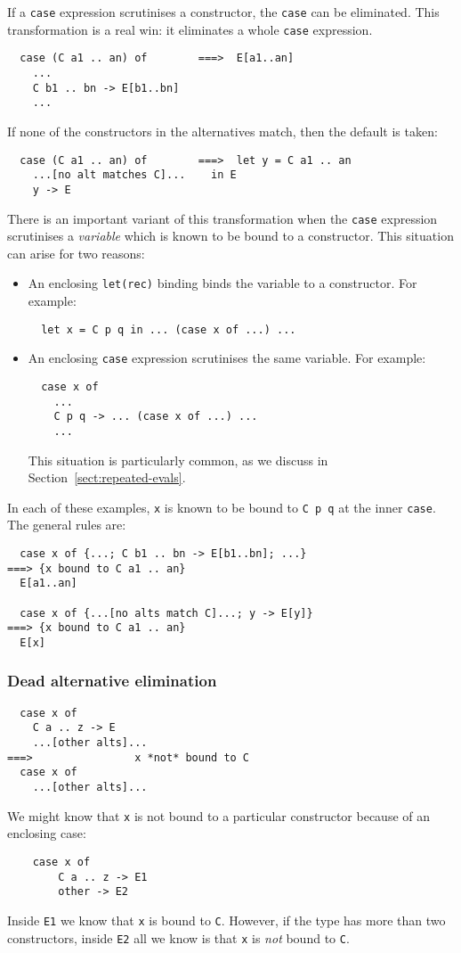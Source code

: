 \documentclass[11pt]{article}
\begin{document}
If a \texttt{case} expression scrutinises a constructor, 
the \texttt{case} can be eliminated.  This transformation is a real
win: it eliminates a whole \texttt{case} expression.
\begin{lstlisting}
  case (C a1 .. an) of		  ===>  E[a1..an]
	...
	C b1 .. bn -> E[b1..bn]
	...
\end{lstlisting}
If none of the constructors in the alternatives match, then
the default is taken:
\begin{lstlisting}
  case (C a1 .. an) of		  ===>  let y = C a1 .. an
	...[no alt matches C]...	in E
	y -> E
\end{lstlisting}
There is an important variant of this transformation when
the \texttt{case} expression scrutinises a {\em variable} 
which is known to be bound to a constructor.  
This situation can
arise for two reasons:
\begin{itemize}
\item An enclosing \texttt{let(rec)} binding binds the variable to a constructor.
For example:
\begin{lstlisting}
  let x = C p q in ... (case x of ...) ...
\end{lstlisting}
\item An enclosing \texttt{case} expression scrutinises the same variable.
For example:
\begin{lstlisting}
  case x of 
	...
	C p q -> ... (case x of ...) ...
	...
\end{lstlisting}
This situation is particularly common, as we discuss in Section~\ref{sect:repeated-evals}.
\end{itemize}
In each of these examples, \texttt{x} is known to be bound to \texttt{C p q} 
at the inner \texttt{case}. The general rules are:
\begin{lstlisting}
  case x of {...; C b1 .. bn -> E[b1..bn]; ...}
===> {x bound to C a1 .. an}
  E[a1..an]

  case x of {...[no alts match C]...; y -> E[y]}
===> {x bound to C a1 .. an}
  E[x]
\end{lstlisting}

\subsubsection{Dead alternative elimination}
\begin{lstlisting}
  case x of 		   
	C a .. z -> E	
	...[other alts]...
===>   				x *not* bound to C
  case x of
	...[other alts]...
\end{lstlisting}
We might know that \texttt{x} is not bound to a particular constructor
because of an enclosing case:
\begin{lstlisting}
	case x of
		C a .. z -> E1
		other -> E2
\end{lstlisting}
Inside \texttt{E1} we know that \texttt{x} is bound to \texttt{C}.
However, if the type has more than two constructors,
inside \texttt{E2} all we know is that \texttt{x} is {\em not} bound to \texttt{C}.
\end{document}
